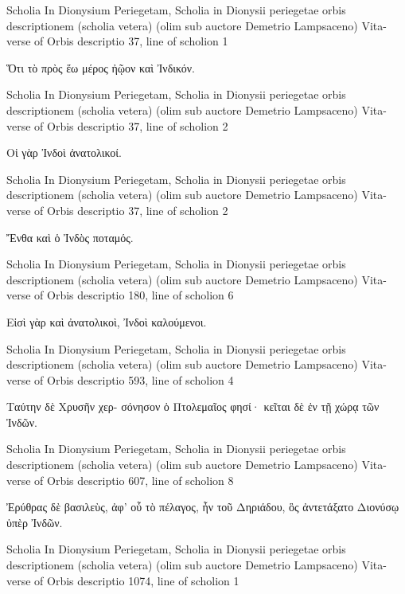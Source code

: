 \documentclass[12pt,letterpaper,twoside,final]{memoir}
\begin{document}
\begin{greek}
Scholia In Dionysium Periegetam, Scholia in Dionysii periegetae orbis descriptionem (scholia vetera) (olim sub auctore Demetrio Lampsaceno) 
Vita-verse of Orbis descriptio 37, line of scholion 1

Ὅτι τὸ πρὸς ἕω μέρος ἠῷον καὶ Ἰνδικόν. 



Scholia In Dionysium Periegetam, Scholia in Dionysii periegetae orbis descriptionem (scholia vetera) (olim sub auctore Demetrio Lampsaceno) 
Vita-verse of Orbis descriptio 37, line of scholion 2

                                                      Οἱ 
γὰρ Ἰνδοὶ ἀνατολικοί. 



Scholia In Dionysium Periegetam, Scholia in Dionysii periegetae orbis descriptionem (scholia vetera) (olim sub auctore Demetrio Lampsaceno) 
Vita-verse of Orbis descriptio 37, line of scholion 2

                            Ἔνθα καὶ ὁ Ἰνδὸς ποταμός. 



Scholia In Dionysium Periegetam, Scholia in Dionysii periegetae orbis descriptionem (scholia vetera) (olim sub auctore Demetrio Lampsaceno) 
Vita-verse of Orbis descriptio 180, line of scholion 6

                                          Εἰσὶ γὰρ καὶ 
ἀνατολικοὶ, Ἰνδοὶ καλούμενοι. 



Scholia In Dionysium Periegetam, Scholia in Dionysii periegetae orbis descriptionem (scholia vetera) (olim sub auctore Demetrio Lampsaceno) 
Vita-verse of Orbis descriptio 593, line of scholion 4

                                 Ταύτην δὲ Χρυσῆν χερ-
σόνησον ὁ Πτολεμαῖος φησί· κεῖται δὲ ἐν τῇ χώρᾳ 
τῶν Ἰνδῶν. 



Scholia In Dionysium Periegetam, Scholia in Dionysii periegetae orbis descriptionem (scholia vetera) (olim sub auctore Demetrio Lampsaceno) 
Vita-verse of Orbis descriptio 607, line of scholion 8

Ἐρύθρας δὲ βασιλεὺς, ἀφ' οὗ τὸ πέλαγος, ἦν τοῦ 
Δηριάδου, ὃς ἀντετάξατο Διονύσῳ ὑπὲρ Ἰνδῶν. 



Scholia In Dionysium Periegetam, Scholia in Dionysii periegetae orbis descriptionem (scholia vetera) (olim sub auctore Demetrio Lampsaceno) 
Vita-verse of Orbis descriptio 1074, line of scholion 1


\end{greek}
\end{document}
